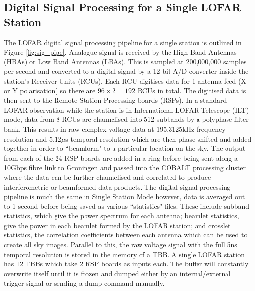 \subsection{Digital Signal Processing for a Single LOFAR Station}
\label{sec:sig_pipe}
The LOFAR digital signal processing pipeline for a single station is outlined in Figure \ref{fig:sig_pipe}. Analogue signal is received by the High Band Antennas (HBAs) or Low Band Antennas (LBAs). This is sampled at 200,000,000 samples per second and converted to a digital signal by a 12 bit A/D converter inside the station's Receiver Units (RCUs). Each RCU digitises data for 1 antenna feed (X or Y polarisation) so there are $96 \times 2 = 192$ RCUs in total. The digitised data is then sent to the Remote Station Processing boards (RSPs). In a standard LOFAR observation while the station is in International LOFAR Telescope (ILT) mode, data from 8 RCUs are channelised into 512 subbands by a polyphase filter bank. This results in raw complex voltage data at 195.3125kHz frequency resolution and 5.12$\mu$s temporal resolution which are then phase shifted and added together in order to ``beamform" to a particular location on the sky. The output from each of the 24 RSP boards are added in a ring before being sent along a 10Gbps fibre link to Groningen and passed into the COBALT processing cluster where the data can be further channelised and correlated to produce interferometric or beamformed data products.
The digital signal processing pipeline is much the same in Single Station Mode however, data is averaged out to 1 second before being saved as various ``statistics" files. These include subband statistics, which give the power spectrum for each antenna; beamlet statistics, give the power in each beamlet formed by the LOFAR station; and crosslet statistics, the correlation coefficients between each antenna which can be used to create all sky images.
Parallel to this, the raw voltage signal with the full 5ns temporal resolution is stored in the memory of a TBB. A single LOFAR station has 12 TBBs which take 2 RSP boards as inputs each. The buffer will constantly overwrite itself until it is frozen and dumped either by an internal/external trigger signal or sending a dump command manually.

